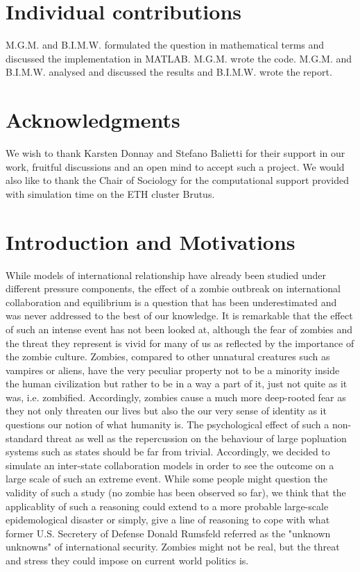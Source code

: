 \documentclass[11pt]{article}
\begin{document}
\section{Individual contributions}\indent

M.G.M. and B.I.M.W. formulated the question in mathematical terms and discussed the implementation in MATLAB. M.G.M. wrote the code. M.G.M. and B.I.M.W. analysed and discussed the results and B.I.M.W. wrote the report.

\section{Acknowledgments}\indent

We wish to thank Karsten Donnay and Stefano Balietti for their support in our work, fruitful discussions and an open mind to accept such a project. We would also like to thank the Chair of Sociology for the computational support provided with simulation time on the ETH cluster Brutus.

\newpage

\section{Introduction and Motivations}\indent

While models of international relationship have already been studied under different pressure components, the effect of a zombie outbreak on international collaboration and equilibrium is a question that has been underestimated and was never addressed to the best of our knowledge. It is remarkable that the effect of such an intense event has not been looked at, although the fear of zombies and the threat they represent is vivid for many of us as reflected by the importance of the zombie culture. Zombies, compared to other unnatural creatures such as vampires or aliens, have the very peculiar property not to be a minority inside the human civilization but rather to be in a way a part of it, just not quite as it was, i.e. zombified. Accordingly, zombies cause a much more deep-rooted fear as they not only threaten our lives but also the our very sense of identity as it questions our notion of what humanity is. The psychological effect of such a non-standard threat as well as the repercussion on the behaviour of large popluation systems such as states should be far from trivial. Accordingly, we decided to simulate an inter-state collaboration models in order to see the outcome on a large scale of such an extreme event. While some people might question the validity of such a study (no zombie has been observed so far), we think that the applicablity of such a reasoning could extend to a more probable large-scale epidemological disaster or simply, give a line of reasoning to cope with what former U.S. Secretery of Defense Donald Rumsfeld referred as the "unknown unknowns" of international security. Zombies might not be real, but the threat and stress they could impose on current world politics is. \\
\end{document}
